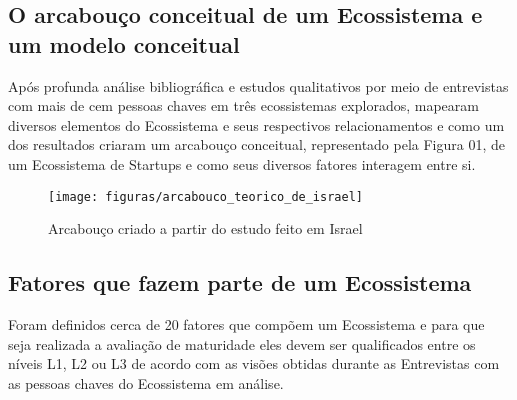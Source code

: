 \subsection{O arcabouço conceitual de um Ecossistema e um modelo conceitual}
\label{subsection:arcabouco_conceitual_e_modelo}

Após profunda análise bibliográfica e estudos qualitativos por meio de entrevistas com mais de cem pessoas chaves em três ecossistemas explorados,  mapearam diversos elementos do Ecossistema e seus respectivos relacionamentos e como um dos resultados criaram um arcabouço conceitual, representado pela Figura 01, de um Ecossistema de Startups e como seus diversos fatores interagem entre si.

\begin{figure}[!htb]
\centering
\texttt{[image: figuras/arcabouco\_teorico\_de\_israel]}
\caption{Arcabouço criado a partir do estudo feito em Israel}
\label{Rotulo}
\end{figure}

\subsection{Fatores que fazem parte de um Ecossistema}
\label{subsection:indicadores_utilizados}

Foram definidos cerca de 20 fatores que compõem um Ecossistema e para que seja realizada a avaliação de maturidade eles devem ser qualificados entre os níveis L1, L2 ou L3 de acordo com as visões obtidas durante as Entrevistas com as pessoas chaves do Ecossistema em análise.


